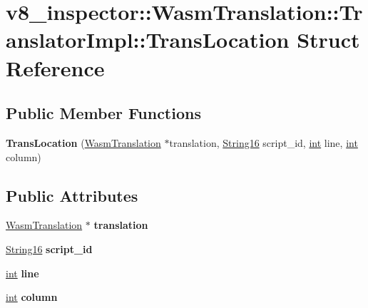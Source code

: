 \hypertarget{structv8__inspector_1_1WasmTranslation_1_1TranslatorImpl_1_1TransLocation}{}\section{v8\+\_\+inspector\+:\+:Wasm\+Translation\+:\+:Translator\+Impl\+:\+:Trans\+Location Struct Reference}
\label{structv8__inspector_1_1WasmTranslation_1_1TranslatorImpl_1_1TransLocation}
\subsection*{Public Member Functions}
\begin{DoxyCompactItemize}
\item 
\mbox{\label{structv8__inspector_1_1WasmTranslation_1_1TranslatorImpl_1_1TransLocation_afd21a25eb442924bf78ed123a8a2205a}} 
{\bfseries Trans\+Location} (\mbox{\hyperlink{classv8__inspector_1_1WasmTranslation}{Wasm\+Translation}} $\ast$translation, \mbox{\hyperlink{classv8__inspector_1_1String16}{String16}} script\+\_\+id, \mbox{\hyperlink{classint}{int}} line, \mbox{\hyperlink{classint}{int}} column)
\end{DoxyCompactItemize}
\subsection*{Public Attributes}
\begin{DoxyCompactItemize}
\item 
\mbox{\label{structv8__inspector_1_1WasmTranslation_1_1TranslatorImpl_1_1TransLocation_a1a011095f31be9e30e0259fb0430dbfa}} 
\mbox{\hyperlink{classv8__inspector_1_1WasmTranslation}{Wasm\+Translation}} $\ast$ {\bfseries translation}
\item 
\mbox{\label{structv8__inspector_1_1WasmTranslation_1_1TranslatorImpl_1_1TransLocation_ab96ba636735327eaa63840295c29583a}} 
\mbox{\hyperlink{classv8__inspector_1_1String16}{String16}} {\bfseries script\+\_\+id}
\item 
\mbox{\label{structv8__inspector_1_1WasmTranslation_1_1TranslatorImpl_1_1TransLocation_a6c8b3187ba23a541e3571b010375a5f9}} 
\mbox{\hyperlink{classint}{int}} {\bfseries line}
\item 
\mbox{\label{structv8__inspector_1_1WasmTranslation_1_1TranslatorImpl_1_1TransLocation_a1b831c705653eaad3e33dc00a36fe847}} 
\mbox{\hyperlink{classint}{int}} {\bfseries column}
\end{DoxyCompactItemize}


